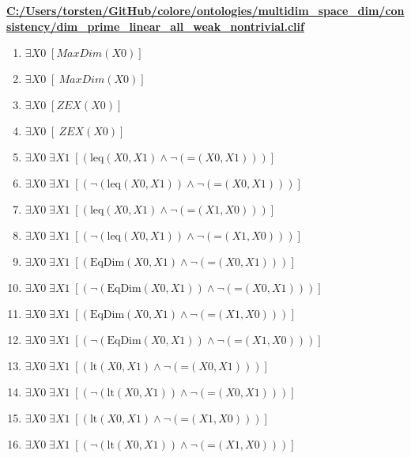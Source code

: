 \documentclass{article}
\begin{document}
\textbf{\url{C:/Users/torsten/GitHub/colore/ontologies/multidim\_space\_dim/consistency/dim\_prime\_linear\_all\_weak\_nontrivial.clif}}

\begin{enumerate}
\item $\exists X0\;  \left[ MaxDim(X0) \right]$
\item $\exists X0\;  \left[ ~MaxDim(X0) \right]$
\item $\exists X0\;  \left[ ZEX(X0) \right]$
\item $\exists X0\;  \left[ ~ZEX(X0) \right]$
\item $\exists X0\; \exists X1\;  \left[ \left(\textrm{leq}(X0,X1) \land \neg \left(\textrm{=}(X0,X1)\right)\right) \right]$
\item $\exists X0\; \exists X1\;  \left[ \left(\neg \left(\textrm{leq}(X0,X1)\right) \land \neg \left(\textrm{=}(X0,X1)\right)\right) \right]$
\item $\exists X0\; \exists X1\;  \left[ \left(\textrm{leq}(X0,X1) \land \neg \left(\textrm{=}(X1,X0)\right)\right) \right]$
\item $\exists X0\; \exists X1\;  \left[ \left(\neg \left(\textrm{leq}(X0,X1)\right) \land \neg \left(\textrm{=}(X1,X0)\right)\right) \right]$
\item $\exists X0\; \exists X1\;  \left[ \left(\textrm{EqDim}(X0,X1) \land \neg \left(\textrm{=}(X0,X1)\right)\right) \right]$
\item $\exists X0\; \exists X1\;  \left[ \left(\neg \left(\textrm{EqDim}(X0,X1)\right) \land \neg \left(\textrm{=}(X0,X1)\right)\right) \right]$
\item $\exists X0\; \exists X1\;  \left[ \left(\textrm{EqDim}(X0,X1) \land \neg \left(\textrm{=}(X1,X0)\right)\right) \right]$
\item $\exists X0\; \exists X1\;  \left[ \left(\neg \left(\textrm{EqDim}(X0,X1)\right) \land \neg \left(\textrm{=}(X1,X0)\right)\right) \right]$
\item $\exists X0\; \exists X1\;  \left[ \left(\textrm{lt}(X0,X1) \land \neg \left(\textrm{=}(X0,X1)\right)\right) \right]$
\item $\exists X0\; \exists X1\;  \left[ \left(\neg \left(\textrm{lt}(X0,X1)\right) \land \neg \left(\textrm{=}(X0,X1)\right)\right) \right]$
\item $\exists X0\; \exists X1\;  \left[ \left(\textrm{lt}(X0,X1) \land \neg \left(\textrm{=}(X1,X0)\right)\right) \right]$
\item $\exists X0\; \exists X1\;  \left[ \left(\neg \left(\textrm{lt}(X0,X1)\right) \land \neg \left(\textrm{=}(X1,X0)\right)\right) \right]$

\end{enumerate}
\end{document}
